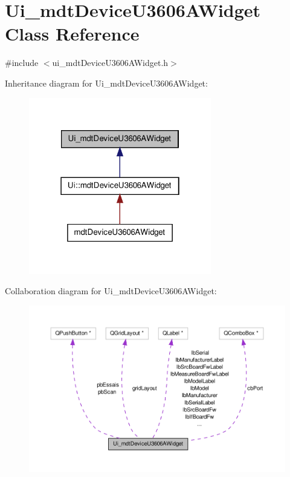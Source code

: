 \hypertarget{class_ui__mdt_device_u3606_a_widget}{\section{Ui\-\_\-mdt\-Device\-U3606\-A\-Widget Class Reference}
\label{class_ui__mdt_device_u3606_a_widget}
}


{\ttfamily \#include $<$ui\-\_\-mdt\-Device\-U3606\-A\-Widget.\-h$>$}



Inheritance diagram for Ui\-\_\-mdt\-Device\-U3606\-A\-Widget\-:\nopagebreak
\begin{figure}[H]
\begin{center}
\leavevmode
\includegraphics[width=226pt]{class_ui__mdt_device_u3606_a_widget__inherit__graph}
\end{center}
\end{figure}


Collaboration diagram for Ui\-\_\-mdt\-Device\-U3606\-A\-Widget\-:\nopagebreak
\begin{figure}[H]
\begin{center}
\leavevmode
\includegraphics[width=350pt]{class_ui__mdt_device_u3606_a_widget__coll__graph}
\end{center}
\end{figure}

